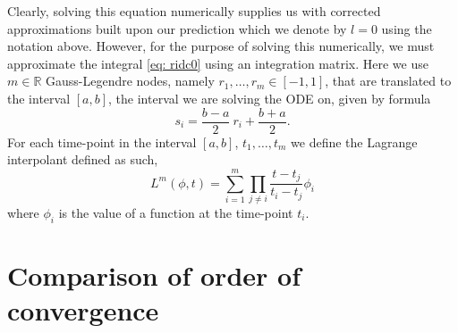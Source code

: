 \documentclass{report}
\begin{document}
Clearly, solving this equation numerically supplies us with corrected approximations built upon our prediction which we denote by $l=0$ using the notation above. However, for the purpose of solving this numerically, we must approximate the integral \ref{eq: ridc0} using an integration matrix. Here we use $m \in \mathbb{R}$ Gauss-Legendre nodes, namely $r_1, \dots, r_m \in [-1,1]$, that are translated to the interval $[a,b]$, the interval we are solving the ODE on, given by formula
\[s_i = \frac{b-a}{2}\ r_i + \frac{b+a}{2}.\]
For each time-point in the interval $[a,b]$, $t_1, \dots, t_m$ we define the Lagrange interpolant defined as such,
\begin{equation}
    L^m(\phi, t) = \sum^m_{i=1} \prod_{j\not=i} \frac{t-t_j}{t_i -t_j} \phi_i
\end{equation}
where $\phi_i$ is the value of a function at the time-point $t_i$.
\section{Comparison of order of convergence}


\printbibliography[title={Bibliography}]
\end{document}

